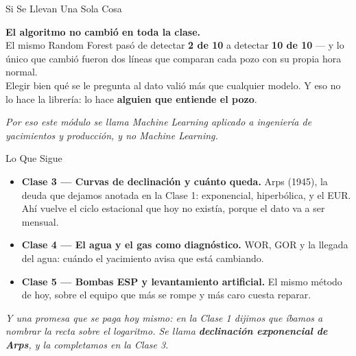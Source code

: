 \documentclass[aspectratio=169, 11pt]{beamer}
\begin{document}
\begin{frame}[shrink=8]{Si Se Llevan Una Sola Cosa}
  \vspace{6pt}
  \begin{tcolorbox}[colback=arcaGray, colframe=arcaRed, boxrule=0pt, leftrule=4pt,
    arc=3pt, left=10pt, right=10pt, top=9pt, bottom=9pt]
    {\large\color{arcaDark}\bfseries
     El algoritmo no cambió en toda la clase.}\\[7pt]
    {\footnotesize\color{textMuted}
     El mismo Random Forest pasó de detectar \textbf{2 de 10} a detectar
     \textbf{10 de 10} --- y lo único que cambió fueron dos líneas que
     comparan cada pozo con su propia hora normal.\\[6pt]
     Elegir bien qué se le pregunta al dato valió más que cualquier modelo.
     Y eso no lo hace la librería: lo hace \textbf{alguien que entiende el
     pozo}.}
  \end{tcolorbox}
  \vspace{8pt}
  {\footnotesize\color{arcaDark}\itshape
   Por eso este módulo se llama \emph{Machine Learning aplicado a ingeniería
   de yacimientos y producción}, y no \emph{Machine Learning}.}
\end{frame}

\begin{frame}[shrink=8]{Lo Que Sigue}
  \vspace{4pt}
  {\footnotesize\color{textMuted}
  \begin{itemize}\setlength{\itemsep}{9pt}
    \item[{\color{arcaRed}\faArrowCircleRight}]
      \textbf{Clase 3 --- Curvas de declinación y cuánto queda.}
      Arps (1945), la deuda que dejamos anotada en la Clase 1: exponencial,
      hiperbólica, y el EUR. Ahí vuelve el ciclo estacional que hoy no
      existía, porque el dato va a ser mensual.
    \item[{\color{arcaRed}\faArrowCircleRight}]
      \textbf{Clase 4 --- El agua y el gas como diagnóstico.}
      WOR, GOR y la llegada del agua: cuándo el yacimiento avisa que está
      cambiando.
    \item[{\color{arcaRed}\faArrowCircleRight}]
      \textbf{Clase 5 --- Bombas ESP y levantamiento artificial.}
      El mismo método de hoy, sobre el equipo que más se rompe y más caro
      cuesta reparar.
  \end{itemize}}
  \vspace{8pt}
  {\scriptsize\color{arcaDark}\itshape
   Y una promesa que se paga hoy mismo: en la Clase 1 dijimos que
   íbamos a nombrar la recta sobre el logaritmo. Se llama
   \textbf{declinación exponencial de Arps}, y la completamos en la Clase 3.}
\end{frame}
\end{document}
